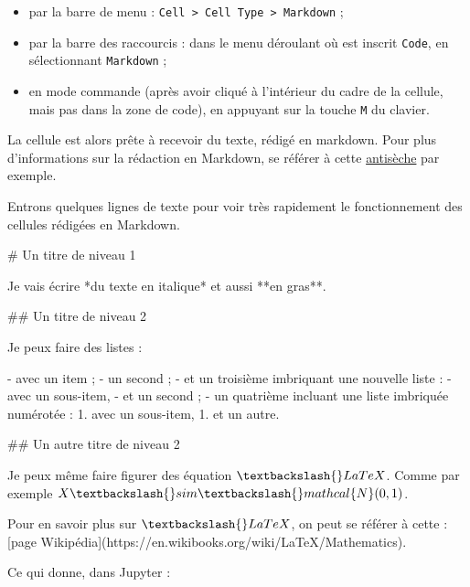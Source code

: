 \documentclass[
  12pt,
]{book}
\newenvironment{Shaded}{\begin{snugshade}}{\end{snugshade}}
\newcommand{\NormalTok}[1]{#1}
\providecommand{\tightlist}{%
  \setlength{\itemsep}{0pt}\setlength{\parskip}{0pt}}
\numberwithin{equation}{section}
\numberwithin{countremarque}{section}
\begin{document}
\begin{itemize}
\tightlist
\item
  par la barre de menu : \texttt{Cell\ \textgreater{}\ Cell\ Type\ \textgreater{}\ Markdown} ;
\item
  par la barre des raccourcis : dans le menu déroulant où est inscrit \texttt{Code}, en sélectionnant \texttt{Markdown} ;
\item
  en mode commande (après avoir cliqué à l'intérieur du cadre de la cellule, mais pas dans la zone de code), en appuyant sur la touche \texttt{M} du clavier.
\end{itemize}

La cellule est alors prête à recevoir du texte, rédigé en markdown. Pour plus d'informations sur la rédaction en Markdown, se référer à cette \href{https://github.com/adam-p/markdown-here/wiki/Markdown-Cheatsheet}{antisèche} par exemple.

Entrons quelques lignes de texte pour voir très rapidement le fonctionnement des cellules rédigées en Markdown.

\begin{Shaded}
\begin{Highlighting}[]
\NormalTok{\# Un titre de niveau 1}

\NormalTok{Je vais écrire *du texte en italique* et aussi **en gras**.}

\NormalTok{\#\# Un titre de niveau 2}

\NormalTok{Je peux faire des listes :}

\NormalTok{{-} avec un item ;}
\NormalTok{{-} un second ;}
\NormalTok{{-} et un troisième imbriquant une nouvelle liste :}
\NormalTok{    {-} avec un sous{-}item,}
\NormalTok{    {-} et un second ;}
\NormalTok{{-} un quatrième incluant une liste imbriquée numérotée :}
\NormalTok{    1. avec un sous{-}item,}
\NormalTok{    1. et un autre.}

\NormalTok{\#\# Un autre titre de niveau 2}


\NormalTok{Je peux même faire figurer des équation $\textbackslash{}LaTeX$.}
\NormalTok{Comme par exemple $X \textbackslash{}sim \textbackslash{}mathcal\{N\}(0,1)$.}

\NormalTok{Pour en savoir plus sur $\textbackslash{}LaTeX$, on peut se référer à cette :}
\NormalTok{  [page Wikipédia](https://en.wikibooks.org/wiki/LaTeX/Mathematics).}
\end{Highlighting}
\end{Shaded}

Ce qui donne, dans Jupyter :
\end{document}

